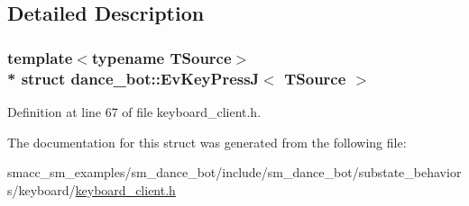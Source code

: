 \subsection{Detailed Description}
\subsubsection*{template$<$typename T\+Source$>$\\*
struct dance\+\_\+bot\+::\+Ev\+Key\+Press\+J$<$ T\+Source $>$}



Definition at line 67 of file keyboard\+\_\+client.\+h.



The documentation for this struct was generated from the following file\+:\begin{DoxyCompactItemize}
\item 
smacc\+\_\+sm\+\_\+examples/sm\+\_\+dance\+\_\+bot/include/sm\+\_\+dance\+\_\+bot/substate\+\_\+behaviors/keyboard/\hyperlink{keyboard__client_8h}{keyboard\+\_\+client.\+h}\end{DoxyCompactItemize}
